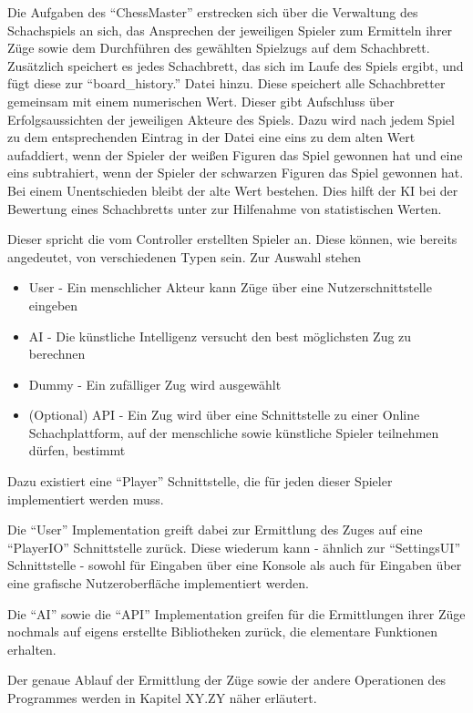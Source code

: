 Die Aufgaben des ``ChessMaster'' erstrecken sich über die Verwaltung des Schachspiels an sich, das Ansprechen der jeweiligen Spieler zum Ermitteln ihrer Züge sowie dem Durchführen des gewählten Spielzugs auf dem Schachbrett. Zusätzlich speichert es jedes Schachbrett, das sich im Laufe des Spiels ergibt, und fügt diese zur ``board\_history.'' Datei hinzu. Diese speichert alle Schachbretter gemeinsam mit einem numerischen Wert. Dieser gibt Aufschluss über Erfolgsaussichten der jeweiligen Akteure des Spiels. Dazu wird nach jedem Spiel zu dem entsprechenden Eintrag in der Datei eine eins zu dem alten Wert aufaddiert, wenn der Spieler der weißen Figuren das Spiel gewonnen hat und eine eins subtrahiert, wenn der Spieler der schwarzen Figuren das Spiel gewonnen hat. Bei einem Unentschieden bleibt der alte Wert bestehen. Dies hilft der KI bei der Bewertung eines Schachbretts unter zur Hilfenahme von statistischen Werten. 

Dieser spricht die vom Controller erstellten Spieler an. Diese können, wie bereits angedeutet, von verschiedenen Typen sein. Zur Auswahl stehen
\begin{itemize}
\item User - Ein menschlicher Akteur kann Züge über eine Nutzerschnittstelle eingeben
\item AI - Die künstliche Intelligenz versucht den best möglichsten Zug zu berechnen
\item Dummy - Ein zufälliger Zug wird ausgewählt
\item (Optional) API - Ein Zug wird über eine Schnittstelle zu einer Online Schachplattform, auf der menschliche sowie künstliche Spieler teilnehmen dürfen, bestimmt
\end{itemize}

Dazu existiert eine ``Player'' Schnittstelle, die für jeden dieser Spieler implementiert werden muss.

Die ``User'' Implementation greift dabei zur Ermittlung des Zuges auf eine ``PlayerIO'' Schnittstelle zurück. Diese wiederum kann - ähnlich zur ``SettingsUI'' Schnittstelle - sowohl für Eingaben über eine Konsole als auch für Eingaben über eine grafische Nutzeroberfläche implementiert werden.

Die ``AI'' sowie die ``API'' Implementation greifen für die Ermittlungen ihrer Züge nochmals auf eigens erstellte Bibliotheken zurück, die elementare Funktionen erhalten.

Der genaue Ablauf der Ermittlung der Züge sowie der andere Operationen des Programmes werden in Kapitel XY.ZY näher erläutert.

